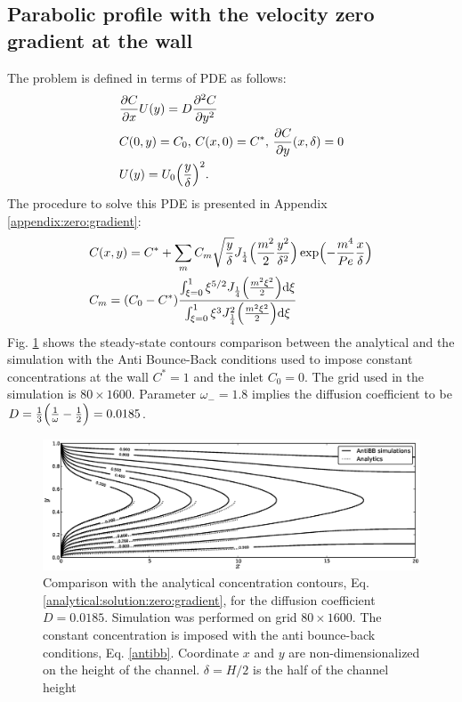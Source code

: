 \documentclass{article}
\newcommand{\beq}{\begin{equation}}
\newcommand{\feq}{\end{equation}}
\newcommand{\cstar}{C^{*}}
\newcommand{\omegaminus}{\omega_{-}}
\begin{document}
\subsection{Parabolic profile with the velocity zero gradient at the wall}
The problem is defined in terms of PDE as follows: 
\beq
\begin{aligned}
&\frac{\partial C}{\partial x} U(y)=D\frac{\partial^2 C}{\partial y^2}\\
&C(0,y)=C_0,\, C(x,0)=\cstar,\, \frac{\partial C}{\partial y }(x,\delta)=0\\
&U(y)=U_0 \Bigl(\frac{y}{\delta}\Bigr)^2.
\end{aligned}
\feq
The procedure to solve this PDE is presented in Appendix \ref{appendix:zero:gradient}:
\beq
\label{analytical:solution:zero:gradient}
\begin{aligned}
&C(x,y)=\cstar+\sum_{m}{C_m
\sqrt{\frac{y}{\delta}}J_{\frac{1}{4}}\Bigl(\frac{m^2}{2}\frac{y^2}{\delta^2}\Bigr)\exp\Bigl(-\frac{
m^4 } { Pe }
\frac { x }{\delta}\Bigr)}\\
&C_m = (C_0-\cstar) \frac{\int_{\xi=0}^{1}{\xi^{5/2} J_{\frac{1}{4}}\Bigl(\frac{m^2
\xi^2}{2}\Bigr)\mathrm{d}\xi}}{\int_{\xi=0}^{1}{\xi^3 J_{\frac{1}{4}}^2\Bigl(\frac{m^2
\xi^2}{2}\Bigr)\mathrm{d}\xi}}
\end{aligned}
\feq
Fig. \ref{fig:parabolic:zero:gradient} shows the steady-state contours comparison between the
analytical and the simulation with the Anti Bounce-Back conditions used to impose constant
concentrations at the wall $\cstar=1$ and the inlet $C_0=0$. The grid used in the simulation is
$80\times1600$. Parameter $\omegaminus=1.8$ implies the diffusion coefficient to be
$D=\frac{1}{3}\Bigl(\frac{1}{\omega}-\frac{1}{2}\Bigr)=0.0185$.  
\begin{figure}[htb!]
\includegraphics[width=\textwidth]{Figures/parabolic_profile_zero_gradient_comparison.eps}
\caption{Comparison with the analytical concentration contours, Eq.
\ref{analytical:solution:zero:gradient}, for the diffusion coefficient $D=0.0185$. Simulation was
performed on grid $80\times 1600$. The constant concentration is imposed with the
anti bounce-back conditions, Eq. \ref{antibb}. Coordinate $x$ and $y$ are non-dimensionalized on
the height of the channel. $\delta=H/2$ is the half of the channel height
\label{fig:parabolic:zero:gradient}}
\end{figure}
 
\end{document}
